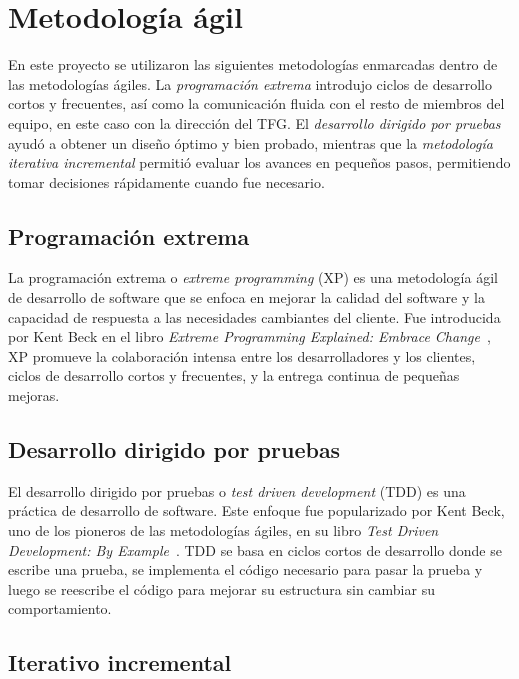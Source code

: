 \section{Metodología ágil}

En este proyecto se utilizaron las siguientes metodologías enmarcadas dentro de las metodologías ágiles.
La \textit{programación extrema} introdujo ciclos de desarrollo cortos y frecuentes, así como la comunicación
fluida con el resto de miembros del equipo, en este caso con la dirección del TFG.
El \textit{desarrollo dirigido por pruebas} ayudó a obtener un diseño óptimo y bien probado, mientras que la
\textit{metodología iterativa incremental} permitió evaluar los avances en pequeños pasos, permitiendo tomar
decisiones rápidamente cuando fue necesario.

\subsection*{Programación extrema}

La programación extrema o \textit{extreme programming} (XP) es una metodología ágil de desarrollo de software que se
enfoca en mejorar la calidad del software y la capacidad de respuesta a las necesidades cambiantes del cliente.
Fue introducida por Kent Beck en el libro \textit{Extreme Programming Explained: Embrace Change}~\cite{book_beck_1999},
XP promueve la colaboración intensa entre los desarrolladores y los clientes, ciclos de desarrollo cortos y frecuentes,
y la entrega continua de pequeñas mejoras.

\subsection*{Desarrollo dirigido por pruebas}

El desarrollo dirigido por pruebas o \textit{test driven development} (TDD) es una práctica de desarrollo de software.
Este enfoque fue popularizado por Kent Beck, uno de los pioneros de las metodologías ágiles, en su libro
\textit{Test Driven Development: By Example}~\cite{book_beck_2003}.
TDD se basa en ciclos cortos de desarrollo donde se escribe una prueba, se implementa el código necesario para pasar la
prueba y luego se reescribe el código para mejorar su estructura sin cambiar su comportamiento.

\subsection*{Iterativo incremental}\label{subsec:iterativo_incremental}

